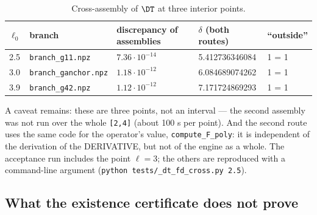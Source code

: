 \begin{table}[h]
\centering
\caption{Cross-assembly of $\DT$ at three interior points.}\label{tab:3.9-dtfd}
{\footnotesize\setlength{\tabcolsep}{4pt}
\begin{tabular}{lllll}
\toprule
$\ell_{0}$ & branch & discrepancy of assemblies & $\delta$ (both routes) & ``outside'' \\
\midrule
2.5 & \texttt{branch\_\allowbreak g11.npz} & $7.36\cdot 10^{-14}$ & 5.412736346084 & 1 = 1 \\
3.0 & \texttt{branch\_\allowbreak ganchor.npz} & $1.18\cdot 10^{-12}$ & 6.084689074262 & 1 = 1 \\
3.9 & \texttt{branch\_\allowbreak g42.npz} & $1.12\cdot 10^{-12}$ & 7.171724869293 & 1 = 1 \\
\bottomrule
\end{tabular}}
\end{table}
\FloatBarrier

A caveat remains: these are three points, not an interval --- the second assembly was not run over the whole \texttt{[2,4]} (about 100 s per point). And the second route uses the same code for the operator's value, \texttt{compute\_\allowbreak F\_\allowbreak poly}: it is independent of the derivation of the DERIVATIVE, but not of the engine as a whole. The acceptance run includes the point $\ell = 3$; the others are reproduced with a command-line argument (\texttt{python tests/\allowbreak \_\allowbreak dt\_\allowbreak fd\_\allowbreak cross.py 2.5}).


\subsection{What the existence certificate does not prove}\label{sec:3.10}

